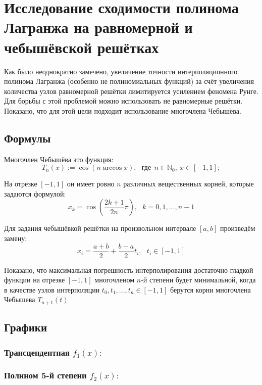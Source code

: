 \clearpage
\section{Исследование сходимости полинома Лагранжа на равномерной и чебышёвской решётках}

Как было неоднократно замечено, увеличение точности интерполяционного полинома Лагранжа (особенно не полиномиальных функций) за счёт увеличения количества узлов равномерной решётки лимитируется усилением феномена Рунге. Для борьбы с этой проблемой можно использовать не равномерные решётки. Показано, что для этой цели подходит использование многочлена Чебышёва.

\subsection{Формулы}

Многочлен Чебышёва это функция:
\begin{equation}
    T_n(x) := \cos(n\arccos x),~~~ \text{где}~~ n\in \mathbb{N}_0, ~ x \in [-1, 1];
\end{equation}

На отрезке $[-1, 1]$ он имеет ровно $n$ различных вещественных корней, которые задаются формулой:
\begin{equation}
    x_k = \cos\left(\frac{2k+1}{2n}\pi\right), ~~~ k=0,1,...,n-1
\end{equation}

Для задания чебышёвкой решётки на произвольном интервале $[a, b]$ произведём замену:
\begin{equation}
    x_i = \frac{a+b}{2} + \frac{b-a}{2}t_i, ~~~ t_i \in [-1,1]
\end{equation}

Показано, что максимальная погрешность интерполирования достаточно гладкой функции на отрезке $[-1, 1]$ многочленом $n$-й степени будет минимальной, когда в качестве узлов интерполяции $t_0,t_1,...,t_n \in [-1, 1]$ берутся корни многочлена Чебышева $T_{n+1}(t)$

\clearpage
\subsection{Графики}
\subsubsection{Трансцендентная $f_1(x):$}


\subsubsection{Полином 5-й степени $f_2(x):$}


